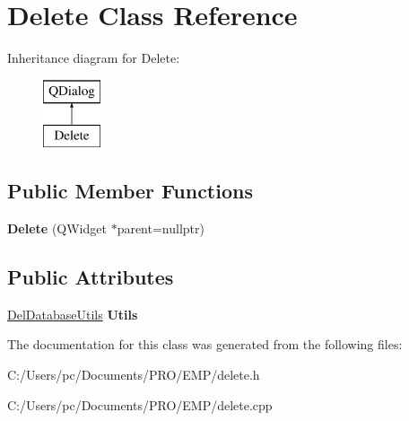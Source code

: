 \hypertarget{class_delete}{}\section{Delete Class Reference}
\label{class_delete}
Inheritance diagram for Delete\+:\begin{figure}[H]
\begin{center}
\leavevmode
\includegraphics[height=2.000000cm]{class_delete}
\end{center}
\end{figure}
\subsection*{Public Member Functions}
\begin{DoxyCompactItemize}
\item 
\mbox{\label{class_delete_a6ff051994905bc978e3a9e53bb48145e}} 
{\bfseries Delete} (Q\+Widget $\ast$parent=nullptr)
\end{DoxyCompactItemize}
\subsection*{Public Attributes}
\begin{DoxyCompactItemize}
\item 
\mbox{\label{class_delete_a01d3766e364970e9adb7d96e539ea5b3}} 
\mbox{\hyperlink{class_del_database_utils}{Del\+Database\+Utils}} {\bfseries Utils}
\end{DoxyCompactItemize}


The documentation for this class was generated from the following files\+:\begin{DoxyCompactItemize}
\item 
C\+:/\+Users/pc/\+Documents/\+P\+R\+O/\+E\+M\+P/delete.\+h\item 
C\+:/\+Users/pc/\+Documents/\+P\+R\+O/\+E\+M\+P/delete.\+cpp\end{DoxyCompactItemize}
